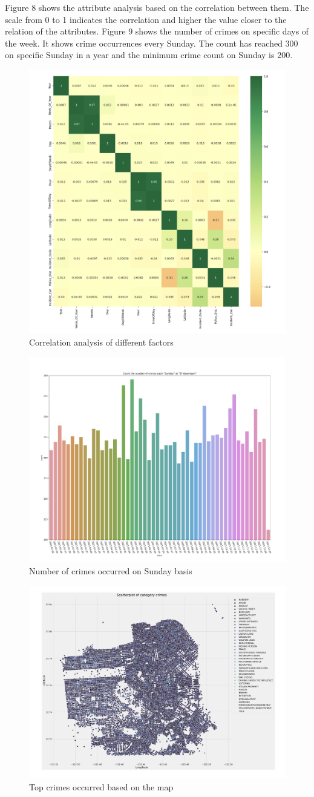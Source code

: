 \documentclass[conference,final,]{IEEEtran}
\begin{document}
Figure 8 shows the attribute analysis based on the correlation between
them. The scale from 0 to 1 indicates the correlation and higher the
value closer to the relation of the attributes. Figure 9 shows the
number of crimes on specific days of the week. It shows crime
occurrences every Sunday. The count has reached 300 on specific Sunday
in a year and the minimum crime count on Sunday is 200.

\begin{figure}

{\centering \includegraphics[width=0.5\linewidth]{img/fig8} 

}

\caption{Correlation analysis of different factors}\label{fig:unnamed-chunk-8}
\end{figure}

\begin{figure}

{\centering \includegraphics[width=0.5\linewidth]{img/fig9} 

}

\caption{Number of crimes occurred on Sunday basis}\label{fig:unnamed-chunk-9}
\end{figure}

\begin{figure}

{\centering \includegraphics[width=0.5\linewidth]{img/fig10} 

}

\caption{Top crimes occurred based on the map}\label{fig:unnamed-chunk-10}
\end{figure}
\end{document}
